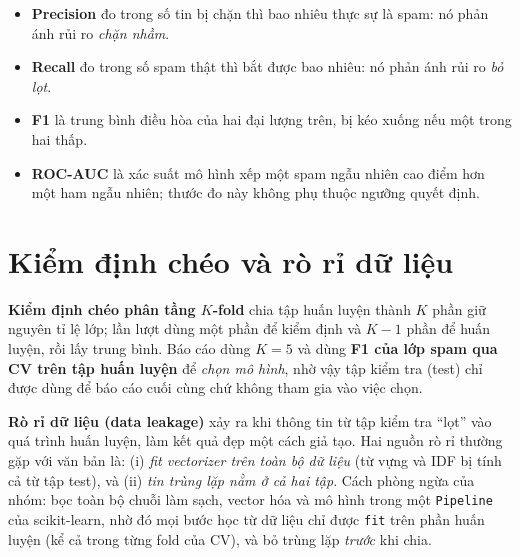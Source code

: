 \begin{itemize}
    \item \textbf{Precision} đo trong số tin bị chặn thì bao nhiêu thực sự là spam: nó phản ánh rủi ro \textit{chặn nhầm}.
    \item \textbf{Recall} đo trong số spam thật thì bắt được bao nhiêu: nó phản ánh rủi ro \textit{bỏ lọt}.
    \item \textbf{F1} là trung bình điều hòa của hai đại lượng trên, bị kéo xuống nếu một trong hai thấp.
    \item \textbf{ROC-AUC} là xác suất mô hình xếp một spam ngẫu nhiên cao điểm hơn một ham ngẫu nhiên; thước đo này không phụ thuộc ngưỡng quyết định.
\end{itemize}

\section{Kiểm định chéo và rò rỉ dữ liệu}

\textbf{Kiểm định chéo phân tầng $K$-fold} chia tập huấn luyện thành $K$ phần giữ nguyên tỉ lệ lớp; lần lượt dùng một phần để kiểm định và $K-1$ phần để huấn luyện, rồi lấy trung bình. Báo cáo dùng $K=5$ và dùng \textbf{F1 của lớp spam qua CV trên tập huấn luyện} để \textit{chọn mô hình}, nhờ vậy tập kiểm tra (test) chỉ được dùng để báo cáo cuối cùng chứ không tham gia vào việc chọn.

\textbf{Rò rỉ dữ liệu (data leakage)} xảy ra khi thông tin từ tập kiểm tra ``lọt'' vào quá trình huấn luyện, làm kết quả đẹp một cách giả tạo. Hai nguồn rò rỉ thường gặp với văn bản là: (i) \textit{fit vectorizer trên toàn bộ dữ liệu} (từ vựng và IDF bị tính cả từ tập test), và (ii) \textit{tin trùng lặp nằm ở cả hai tập}. Cách phòng ngừa của nhóm: bọc toàn bộ chuỗi làm sạch, vector hóa và mô hình trong một \texttt{Pipeline} của scikit-learn, nhờ đó mọi bước học từ dữ liệu chỉ được \texttt{fit} trên phần huấn luyện (kể cả trong từng fold của CV), và bỏ trùng lặp \textit{trước} khi chia.
